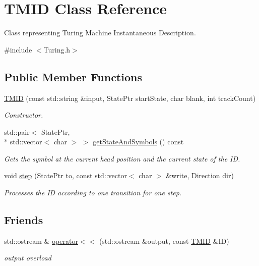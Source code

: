 \hypertarget{class_t_m_i_d}{\section{T\-M\-I\-D Class Reference}
\label{class_t_m_i_d}
}


Class representing Turing Machine Instantaneous Description.  




{\ttfamily \#include $<$Turing.\-h$>$}

\subsection*{Public Member Functions}
\begin{DoxyCompactItemize}
\item 
\hyperlink{class_t_m_i_d_a11d43c3e85716bcafb6e16baf3391f85}{T\-M\-I\-D} (const std\-::string \&input, State\-Ptr start\-State, char blank, int track\-Count)
\begin{DoxyCompactList}\small\item\em Constructor. \end{DoxyCompactList}\item 
std\-::pair$<$ State\-Ptr, \\*
std\-::vector$<$ char $>$ $>$ \hyperlink{class_t_m_i_d_ae0cbe3aa4c413db223bbd72700bcbfcb}{get\-State\-And\-Symbols} () const 
\begin{DoxyCompactList}\small\item\em Gets the symbol at the current head position and the current state of the I\-D. \end{DoxyCompactList}\item 
void \hyperlink{class_t_m_i_d_a2b90e00de589785a077437b2c4c46eaf}{step} (State\-Ptr to, const std\-::vector$<$ char $>$ \&write, Direction dir)
\begin{DoxyCompactList}\small\item\em Processes the I\-D according to one transition for one step. \end{DoxyCompactList}\end{DoxyCompactItemize}
\subsection*{Friends}
\begin{DoxyCompactItemize}
\item 
\hypertarget{class_t_m_i_d_a96968753e6bd4be3fb59bba1cd84ff32}{std\-::ostream \& \hyperlink{class_t_m_i_d_a96968753e6bd4be3fb59bba1cd84ff32}{operator$<$$<$} (std\-::ostream \&output, const \hyperlink{class_t_m_i_d}{T\-M\-I\-D} \&I\-D)}\label{class_t_m_i_d_a96968753e6bd4be3fb59bba1cd84ff32}

\begin{DoxyCompactList}\small\item\em output overload \end{DoxyCompactList}\end{DoxyCompactItemize}


